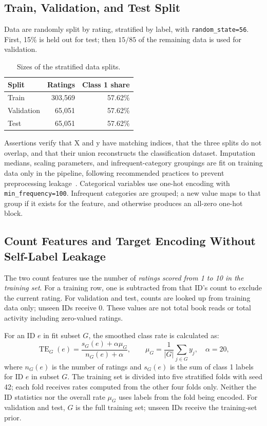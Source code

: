 \documentclass[12pt,a4paper]{article}
\newcommand{\code}[1]{\texttt{#1}}
\newcommand{\source}[1]{\par\smallskip{\raggedright\footnotesize\color{muted}Source: #1.\par}}
\begin{document}
\subsection{Train, Validation, and Test Split}
Data are randomly split by rating, stratified by label, with \code{random\_state=56}. First, 15\%
is held out for test; then $15/85$ of the remaining data is used for validation.
\begin{table}[htbp]
\centering
\caption{Sizes of the stratified data splits.}\label{tab:split}
\begin{tabular}{lrr}
\toprule
Split & Ratings & Class 1 share \\
\midrule
Train & 303,569 & 57.62\% \\
Validation & 65,051 & 57.62\% \\
Test & 65,051 & 57.62\% \\
\bottomrule
\end{tabular}
\source{Notebook, Section 5.2}
\end{table}
\FloatBarrier

Assertions verify that X and y have matching indices, that the three splits do not overlap, and
that their union reconstructs the classification dataset. Imputation medians, scaling parameters,
and infrequent-category groupings are fit on training data only in the pipeline, following
recommended practices to prevent preprocessing leakage~\cite{pitfalls}. Categorical variables use
one-hot encoding with \code{min\_frequency=100}. Infrequent categories are grouped; a new value
maps to that group if it exists for the feature, and otherwise produces an all-zero one-hot block.

\subsection{Count Features and Target Encoding Without Self-Label Leakage}
The two count features use the number of \emph{ratings scored from 1 to 10 in the training set}.
For a training row, one is subtracted from that ID's count to exclude the current rating. For
validation and test, counts are looked up from training data only; unseen IDs receive 0. These
values are not total book reads or total activity including zero-valued ratings.

For an ID $e$ in fit subset $G$, the smoothed class rate is calculated as:
\begin{equation}
 \operatorname{TE}_{G}(e)=\frac{s_G(e)+\alpha\mu_G}{n_G(e)+\alpha},\qquad
 \mu_G=\frac{1}{|G|}\sum_{j\in G}y_j,\quad\alpha=20,
 \label{eq:te}
\end{equation}
where $n_G(e)$ is the number of ratings and $s_G(e)$ is the sum of class 1 labels for ID $e$ in
subset $G$. The training set is divided into five stratified folds with seed 42; each fold receives
rates computed from the other four folds only. Neither the ID statistics nor the overall rate
$\mu_G$ uses labels from the fold being encoded. For validation and test, $G$ is the full training
set; unseen IDs receive the training-set prior.
\end{document}
